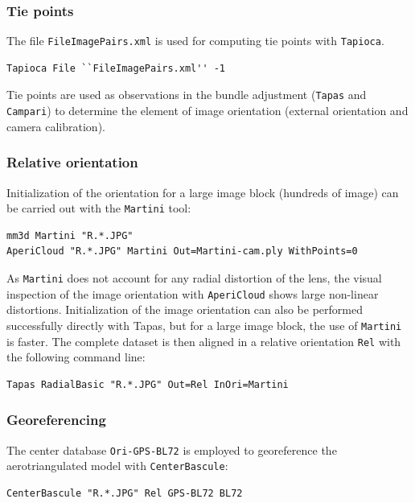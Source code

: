 \subsubsection{Tie points}
The file {\tt FileImagePairs.xml} is used for computing tie points with {\tt Tapioca}.

\begin{verbatim}
Tapioca File ``FileImagePairs.xml'' -1
\end{verbatim}

Tie points are used as observations in the bundle adjustment ({\tt Tapas} and {\tt Campari}) to determine the element of image orientation (external orientation and camera calibration). 

\subsubsection{Relative orientation}

Initialization of the orientation for a large image block (hundreds of image) can be carried out with the {\tt Martini} tool:

\begin{verbatim}
mm3d Martini "R.*.JPG"
AperiCloud "R.*.JPG" Martini Out=Martini-cam.ply WithPoints=0
\end{verbatim}
As {\tt Martini} does not account for any radial distortion of the lens, the visual inspection of the image orientation with {\tt AperiCloud} shows large non-linear distortions.
Initialization of the image orientation can also be performed successfully directly with {Tapas}, but for a large image block, the use of {\tt Martini} is faster.
The complete dataset is then aligned in a relative orientation {\tt Rel} with the following command line:

\begin{verbatim}
Tapas RadialBasic "R.*.JPG" Out=Rel InOri=Martini
\end{verbatim}

\subsubsection{Georeferencing}

The center database {\tt Ori-GPS-BL72} is employed to georeference the aerotriangulated model with { \tt CenterBascule}:

\begin{verbatim}
CenterBascule "R.*.JPG" Rel GPS-BL72 BL72
\end{verbatim}

